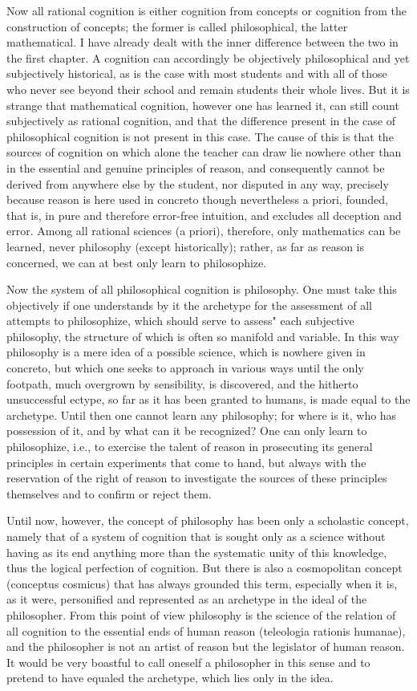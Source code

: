\documentclass{article}
\begin{document}
Now all rational cognition is either cognition from concepts
or cognition from the construction of concepts; 
the former is called philosophical, the latter mathematical.
I have already dealt with the inner difference between 
the two in the first chapter.
A cognition can accordingly be objectively philosophical
and yet subjectively historical,
as is the case with most students
and with all of those who never see beyond their school
and remain students their whole lives. 
But it is strange that mathematical cognition, however one has learned it,
can still count subjectively as rational cognition,
and that the difference present in the case of 
philosophical cognition is not present in this case.
The cause of this is that the sources of cognition on which alone
the teacher can draw lie nowhere other than in the
essential and genuine principles of reason,
and consequently cannot be derived from anywhere else by the student,
nor disputed in any way, precisely because
reason is here used in concreto though nevertheless a priori,
founded, that is, in pure and therefore error-free intuition,
and excludes all deception and error. 
Among all rational sciences (a priori), therefore,
only mathematics can be learned, never philosophy (except historically); 
rather, as far as reason is concerned, we can at best only learn to philosophize.

Now the system of all philosophical cognition is philosophy.
One must take this objectively if one understands by it the archetype for the assessment
of all attempts to philosophize, which should serve to assess" each subjective philosophy,
the structure of which is often so manifold and variable. 
In this way philosophy is a mere idea of a possible science,
which is nowhere given in concreto,
but which one seeks to approach in various ways until the only footpath,
much overgrown by sensibility, is discovered,
and the hitherto unsuccessful ectype,
so far as it has been granted to humans,
is made equal to the archetype.
Until then one cannot learn any philosophy;
for where is it, who has possession of it,
and by what can it be recognized?
One can only learn to philosophize,
i.e., to exercise the talent of reason in prosecuting its general
principles in certain experiments that come to hand,
but always with the reservation of the right of reason
to investigate the sources of these
principles themselves and to confirm or reject them.

Until now, however, the concept of philosophy has been only a scholastic concept,
namely that of a system of cognition that is sought
only as a science without having as its end anything more
than the systematic unity of this knowledge,
thus the logical perfection of cognition.
But there is also a cosmopolitan concept (conceptus cosmicus)
that has always grounded this term,
especially when it is, as it were, personified 
and represented as an archetype in the ideal of the philosopher.
From this point of view philosophy is
the science of the relation of all  cognition
to the essential ends of human reason (teleologia rationis humanae),
and the philosopher is not an artist of reason
but the legislator of human reason.
It would be very boastful to call oneself a philosopher in this sense
and to pretend to have equaled the archetype, which lies only in the idea.
\end{document}
